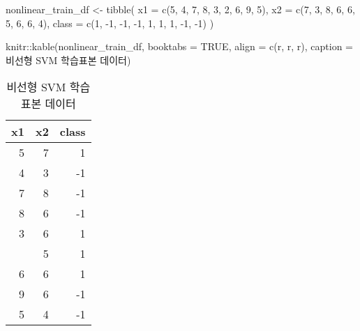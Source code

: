 \documentclass[
]{book}
\newenvironment{Shaded}{\begin{snugshade}}{\end{snugshade}}
\newcommand{\AttributeTok}[1]{\textcolor[rgb]{0.77,0.63,0.00}{#1}}
\newcommand{\ConstantTok}[1]{\textcolor[rgb]{0.00,0.00,0.00}{#1}}
\newcommand{\DecValTok}[1]{\textcolor[rgb]{0.00,0.00,0.81}{#1}}
\newcommand{\FunctionTok}[1]{\textcolor[rgb]{0.00,0.00,0.00}{#1}}
\newcommand{\NormalTok}[1]{#1}
\newcommand{\OtherTok}[1]{\textcolor[rgb]{0.56,0.35,0.01}{#1}}
\newcommand{\SpecialCharTok}[1]{\textcolor[rgb]{0.00,0.00,0.00}{#1}}
\newcommand{\StringTok}[1]{\textcolor[rgb]{0.31,0.60,0.02}{#1}}
\begin{document}
\begin{Shaded}
\begin{Highlighting}[]
\NormalTok{nonlinear\_train\_df }\OtherTok{\textless{}{-}} \FunctionTok{tibble}\NormalTok{(}
  \AttributeTok{x1 =} \FunctionTok{c}\NormalTok{(}\DecValTok{5}\NormalTok{, }\DecValTok{4}\NormalTok{, }\DecValTok{7}\NormalTok{, }\DecValTok{8}\NormalTok{, }\DecValTok{3}\NormalTok{, }\DecValTok{2}\NormalTok{, }\DecValTok{6}\NormalTok{, }\DecValTok{9}\NormalTok{, }\DecValTok{5}\NormalTok{), }
  \AttributeTok{x2 =} \FunctionTok{c}\NormalTok{(}\DecValTok{7}\NormalTok{, }\DecValTok{3}\NormalTok{, }\DecValTok{8}\NormalTok{, }\DecValTok{6}\NormalTok{, }\DecValTok{6}\NormalTok{, }\DecValTok{5}\NormalTok{, }\DecValTok{6}\NormalTok{, }\DecValTok{6}\NormalTok{, }\DecValTok{4}\NormalTok{), }
  \AttributeTok{class =} \FunctionTok{c}\NormalTok{(}\DecValTok{1}\NormalTok{, }\SpecialCharTok{{-}}\DecValTok{1}\NormalTok{, }\SpecialCharTok{{-}}\DecValTok{1}\NormalTok{, }\SpecialCharTok{{-}}\DecValTok{1}\NormalTok{, }\DecValTok{1}\NormalTok{, }\DecValTok{1}\NormalTok{, }\DecValTok{1}\NormalTok{, }\SpecialCharTok{{-}}\DecValTok{1}\NormalTok{, }\SpecialCharTok{{-}}\DecValTok{1}\NormalTok{)}
\NormalTok{)}

\NormalTok{knitr}\SpecialCharTok{::}\FunctionTok{kable}\NormalTok{(nonlinear\_train\_df, }\AttributeTok{booktabs =} \ConstantTok{TRUE}\NormalTok{,}
             \AttributeTok{align =} \FunctionTok{c}\NormalTok{(}\StringTok{\textquotesingle{}r\textquotesingle{}}\NormalTok{, }\StringTok{\textquotesingle{}r\textquotesingle{}}\NormalTok{, }\StringTok{\textquotesingle{}r\textquotesingle{}}\NormalTok{),}
             \AttributeTok{caption =} \StringTok{\textquotesingle{}비선형 SVM 학습표본 데이터\textquotesingle{}}\NormalTok{)}
\end{Highlighting}
\end{Shaded}

\begin{table}

\caption{\label{tab:nonlinear-svm-train-data}비선형 SVM 학습표본 데이터}
\centering
\begin{tabular}[t]{rrr}
\toprule
x1 & x2 & class\\
\midrule
5 & 7 & 1\\
4 & 3 & -1\\
7 & 8 & -1\\
8 & 6 & -1\\
3 & 6 & 1\\
\addlinespace
2 & 5 & 1\\
6 & 6 & 1\\
9 & 6 & -1\\
5 & 4 & -1\\
\bottomrule
\end{tabular}
\end{table}
\end{document}
